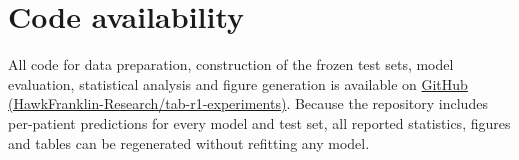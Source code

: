 \section*{Code availability}
All code for data preparation, construction of the frozen test sets, model evaluation, statistical analysis and figure generation is available on \href{https://github.com/HawkFranklin-Research/tab-r1-experiments}{GitHub (HawkFranklin-Research/tab-r1-experiments)}. Because the repository includes per-patient predictions for every model and test set, all reported statistics, figures and tables can be regenerated without refitting any model.
